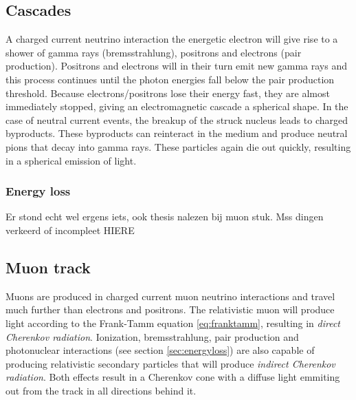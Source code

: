 \subsection{Cascades}
A charged current neutrino interaction the energetic electron will give rise to a shower of gamma rays (bremsstrahlung), positrons and electrons (pair production). Positrons and electrons will in their turn emit new gamma rays and this process continues until the photon energies fall below the pair production threshold. Because electrons/positrons lose their energy fast, they are almost immediately stopped, giving an electromagnetic cascade a spherical shape. In the case of neutral current events, the breakup of the struck nucleus leads to charged byproducts. These byproducts can reinteract in the medium and produce neutral pions that decay into gamma rays. These particles again die out quickly, resulting in a spherical emission of light.

\subsubsection{Energy loss}
Er stond echt wel ergens iets, ook thesis nalezen bij muon stuk. Mss dingen verkeerd of incompleet
HIERE































\subsection{Muon track}
Muons are produced in charged current muon neutrino interactions and travel much further than electrons and positrons. The relativistic muon will produce light according to the Frank-Tamm equation \ref{eq:franktamm}, resulting in \textit{direct Cherenkov radiation}. Ionization, bremsstrahlung, pair production and photonuclear interactions (see section \ref{sec:energyloss}) are also capable of producing relativistic secondary particles that will produce \textit{indirect Cherenkov radiation}. Both effects result in a Cherenkov cone with a diffuse light emmiting out from the track in all directions behind it. 

